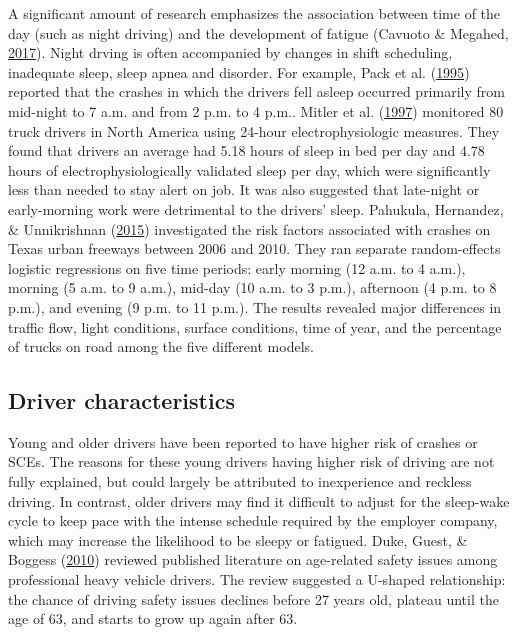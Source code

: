 \documentclass[12pt]{book}
\numberwithin{equation}{chapter}
\begin{document}
A significant amount of research emphasizes the association between time of the day (such as night driving) and the development of fatigue (Cavuoto \& Megahed, \protect\hyperlink{ref-cavuoto2017understanding}{2017}). Night drving is often accompanied by changes in shift scheduling, inadequate sleep, sleep apnea and disorder. For example, Pack et al. (\protect\hyperlink{ref-pack1995characteristics}{1995}) reported that the crashes in which the drivers fell asleep occurred primarily from mid-night to 7 a.m. and from 2 p.m. to 4 p.m.. Mitler et al. (\protect\hyperlink{ref-mitler1997sleep}{1997}) monitored 80 truck drivers in North America using 24-hour electrophysiologic measures. They found that drivers an average had 5.18 hours of sleep in bed per day and 4.78 hours of electrophysiologically validated sleep per day, which were significantly less than needed to stay alert on job. It was also suggested that late-night or early-morning work were detrimental to the drivers' sleep. Pahukula, Hernandez, \& Unnikrishnan (\protect\hyperlink{ref-pahukula2015time}{2015}) investigated the risk factors associated with crashes on Texas urban freeways between 2006 and 2010. They ran separate random-effects logistic regressions on five time periods: early morning (12 a.m. to 4 a.m.), morning (5 a.m. to 9 a.m.), mid-day (10 a.m. to 3 p.m.), afternoon (4 p.m. to 8 p.m.), and evening (9 p.m. to 11 p.m.). The results revealed major differences in traffic flow, light conditions, surface conditions, time of year, and the percentage of trucks on road among the five different models.

\hypertarget{driver-characteristics}{%
\subsection{Driver characteristics}\label{driver-characteristics}}

Young and older drivers have been reported to have higher risk of crashes or SCEs. The reasons for these young drivers having higher risk of driving are not fully explained, but could largely be attributed to inexperience and reckless driving. In contrast, older drivers may find it difficult to adjust for the sleep-wake cycle to keep pace with the intense schedule required by the employer company, which may increase the likelihood to be sleepy or fatigued. Duke, Guest, \& Boggess (\protect\hyperlink{ref-duke2010age}{2010}) reviewed published literature on age-related safety issues among professional heavy vehicle drivers. The review suggested a U-shaped relationship: the chance of driving safety issues declines before 27 years old, plateau until the age of 63, and starts to grow up again after 63.
\end{document}
